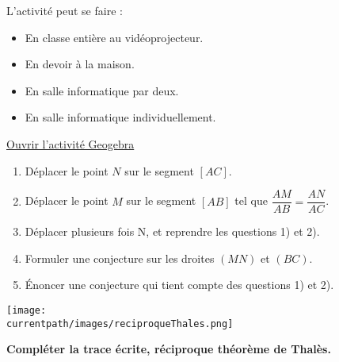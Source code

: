 \begin{activite}
    
        \begin{remarque}
            L'activité peut se faire :
            \begin{itemize}
                \item En classe entière au vidéoprojecteur.
                \item En devoir à la maison.
                \item En salle informatique par deux.
                \item En salle informatique individuellement.
            \end{itemize}
        \end{remarque}
        
        \href{https://www.geogebra.org/m/nztvwr9b}{ Ouvrir l'activité Geogebra}

        \begin{enumerate}
            \item Déplacer le point $N$ sur le segment $[AC]$.
            \item Déplacer le point $M$ sur le segment $[AB]$ tel que $\dfrac{AM}{AB}=\dfrac{AN}{AC}$.
            \item Déplacer plusieurs fois N, et reprendre les questions 1) et 2).
            \item Formuler une conjecture sur les droites $(MN)$ et $(BC)$.
            \item Énoncer une conjecture qui tient compte des questions 1) et 2).
        \end{enumerate}

        \begin{center}
            \texttt{[image: \\currentpath/images/reciproqueThales.png]}
        \end{center}

        \textbf{Compléter la trace écrite, réciproque théorème de Thalès.}
\end{activite}